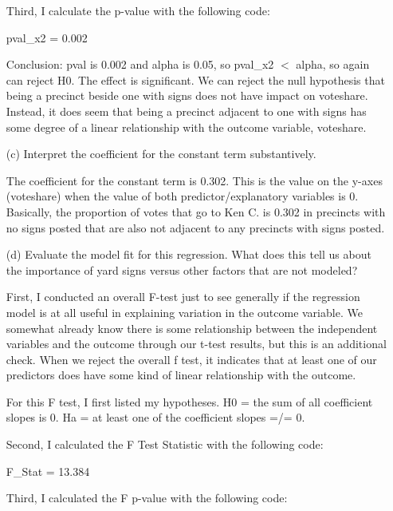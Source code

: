 \documentclass[12pt,letterpaper]{article}
\begin{document}
\begin{enumerate}
	Third, I calculate the p-value with the following code:
	
	
	pval\_x2 = 0.002
	
	Conclusion: pval is 0.002 and alpha is 0.05, so pval\_x2 $<$ alpha, so again can reject H0. The effect is significant.
	We can reject the null hypothesis that being a precinct beside one with signs does not have impact
	on voteshare. Instead, it does seem that being a precinct adjacent to one with signs has some degree of a linear relationship with the outcome variable, voteshare.
	
	\vspace{2cm}
	\item [(c)] Interpret the coefficient for the constant term substantively.
	
	The coefficient for the constant term is 0.302. This is the value on the y-axes (voteshare) when the value of both predictor/explanatory variables is 0. Basically, the proportion of votes that go to Ken C. is 0.302 in precincts with no signs posted that are also not adjacent to any precincts with signs posted.
	
	\vspace{10cm}
	
	\item [(d)] Evaluate the model fit for this regression.  What does this	tell us about the importance of yard signs versus other factors that are not modeled?
	
	First, I conducted an overall F-test just to see generally if the regression model is at all useful in explaining variation in the outcome variable. We somewhat already know there is some relationship between the independent variables and the outcome through our t-test results, but this is an additional check. When we reject the overall f test, it indicates that at least one of our predictors does have some kind of linear relationship with the outcome. 
	
	For this F test, I first listed my hypotheses. H0 = the sum of all coefficient slopes is 0. Ha = at least one of the coefficient slopes =/= 0.
	
	Second, I calculated the F Test Statistic with the following code:
	
	
	
	F\_Stat = 13.384
	
	Third, I calculated the F p-value with the following code:
	

\end{enumerate}
\end{document}
